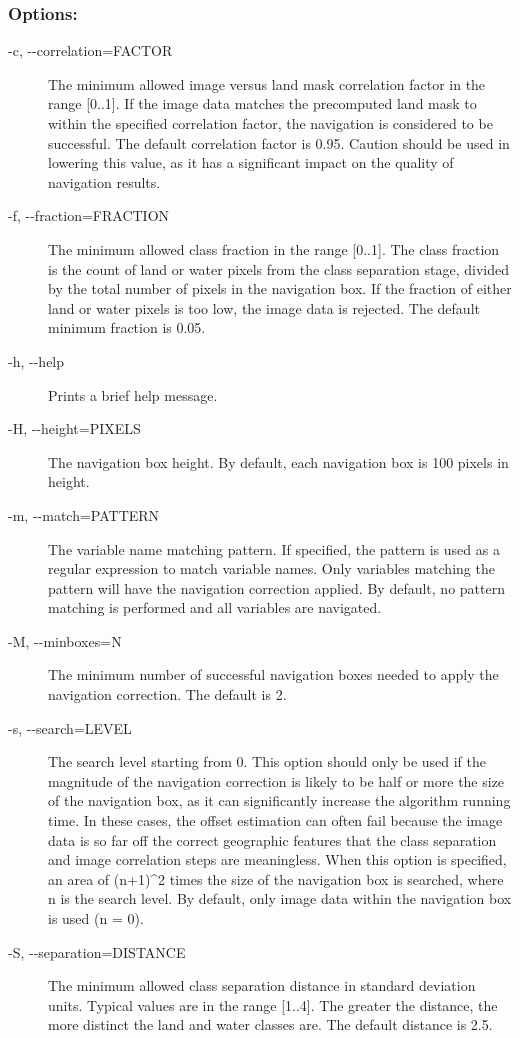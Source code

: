 \subsubsection*{Options:}
\begin{description}
\item[ -c, -{-}correlation=FACTOR ] The minimum allowed image versus land mask correlation factor in the range [0..1]. If the image data matches the precomputed land mask to within the specified correlation factor, the navigation is considered to be successful. The default correlation factor is 0.95. Caution should be used in lowering this value, as it has a significant impact on the quality of navigation results. 
\item[ -f, -{-}fraction=FRACTION ] The minimum allowed class fraction in the range [0..1]. The class fraction is the count of land or water pixels from the class separation stage, divided by the total number of pixels in the navigation box. If the fraction of either land or water pixels is too low, the image data is rejected. The default minimum fraction is 0.05. 
\item[ -h, -{-}help ] Prints a brief help message. 
\item[ -H, -{-}height=PIXELS ] The navigation box height. By default, each navigation box is 100 pixels in height. 
\item[ -m, -{-}match=PATTERN ] The variable name matching pattern. If specified, the pattern is used as a regular expression to match variable names. Only variables matching the pattern will have the navigation correction applied. By default, no pattern matching is performed and all variables are navigated. 
\item[ -M, -{-}minboxes=N ] The minimum number of successful navigation boxes needed to apply the navigation correction. The default is 2. 
\item[ -s, -{-}search=LEVEL ] The search level starting from 0. This option should only be used if the magnitude of the navigation correction is likely to be half or more the size of the navigation box, as it can significantly increase the algorithm running time. In these cases, the offset estimation can often fail because the image data is so far off the correct geographic features that the class separation and image correlation steps are meaningless. When this option is specified, an area of (n+1)\^{}2 times the size of the navigation box is searched, where n is the search level. By default, only image data within the navigation box is used (n = 0). 
\item[ -S, -{-}separation=DISTANCE ] The minimum allowed class separation distance in standard deviation units. Typical values are in the range [1..4]. The greater the distance, the more distinct the land and water classes are. The default distance is 2.5. 

\end{description}
